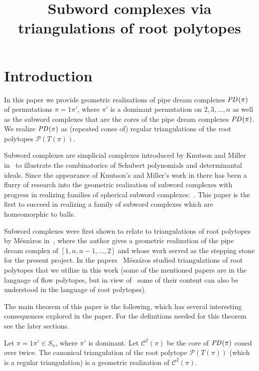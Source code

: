 \documentclass[ALCO,ThmDefs]{cedram}
\title {Subword complexes via triangulations of root polytopes}
\author[\initial{L.} Escobar]{\firstname{Laura} \lastname{Escobar}}
\author[\initial{K.} M{\'e}sz\'aros]{\firstname{Karola} \lastname{M{\'e}sz\'aros}}
\numberwithin{equation}{section}
\renewcommand*\P{{\mathcal{P}}}
\newcommand*\+{\smash{\lower2pt\hbox{\rlap{\vrule height14pt}}\raise2pt\hbox{\rlap{\hskip-3pt \vrule height.4pt depth0pt width14.7pt}}}}
\newcommand*{\MK}{\mkern 2mu}
\DeclareMathOperator{\PD}{\textit{PD}\MK}
\begin{document}
\maketitle

\section{Introduction}

In this paper we provide geometric realizations of pipe dream complexes $\PD(\pi)$ of permutations $\pi=1\pi'$, where $\pi'$ is a dominant permutation on $2,3,\dots, n$ as well as the subword complexes that are the cores of the pipe dream complexes $\PD(\pi)$. We realize $\PD(\pi)$ as (repeated cones of) regular triangulations of the root polytopes $\P(T(\pi))$.

Subword complexes are simplicial complexes introduced by Knutson and Miller in~\cite{subword,annals} to illustrate the combinatorics of Schubert polynomials and determinantal ideals. Since the appearance of Knutson's and Miller's work in there has been a flurry of research into the geometric realization of subword complexes with progress in realizing families of spherical subword complexes:~\cite{reviewedfansub,cesar,subwordcluster,escobar,assoc,abrick,SerranoStump,stump}. This paper is the first to succeed in realizing a family of subword complexes which are homeomorphic to balls.

Subword complexes were first shown to relate to triangulations of root polytopes by M{\'e}sz\'aros in~\cite{groth}, where the author gives a geometric realization of the pipe dream complex of $[1,n,n-1,\dots,2]$ and whose work served as the stepping stone for the present project. In the papers~\cite{root1, h-poly1, prod, h-poly2} M{\'e}sz\'aros studied triangulations of root polytopes that we utilize in this work (some of the mentioned papers are in the language of flow polytopes, but in view of~\cite[Section~4]{groth} some of their content can also be understood in the language of root polytopes).

The main theorem of this paper is the following, which has several interesting consequences explored in the paper. For the definitions needed for this theorem see the later sections.

\begin{theo}\label{thm:intro}
Let $\pi=1\pi' \in S_n$, where $\pi'$ is dominant. Let $\mathcal{C}^2(\pi)$ be the core of $\PD(\pi)$ coned over twice. The canonical triangulation of the root polytope $\P(T(\pi))$ (which is a regular triangulation) is a geometric realization of $\mathcal{C}^2(\pi)$.
\end{theo}
\end{document}
